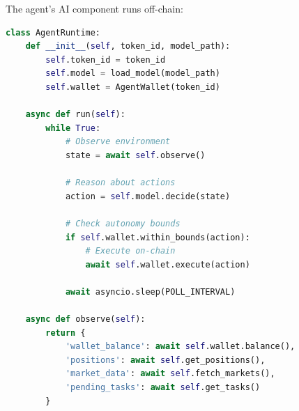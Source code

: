 The agent's AI component runs off-chain:

\begin{lstlisting}[language=python,caption=Agent Runtime]
class AgentRuntime:
    def __init__(self, token_id, model_path):
        self.token_id = token_id
        self.model = load_model(model_path)
        self.wallet = AgentWallet(token_id)

    async def run(self):
        while True:
            # Observe environment
            state = await self.observe()

            # Reason about actions
            action = self.model.decide(state)

            # Check autonomy bounds
            if self.wallet.within_bounds(action):
                # Execute on-chain
                await self.wallet.execute(action)

            await asyncio.sleep(POLL_INTERVAL)

    async def observe(self):
        return {
            'wallet_balance': await self.wallet.balance(),
            'positions': await self.get_positions(),
            'market_data': await self.fetch_markets(),
            'pending_tasks': await self.get_tasks()
        }
\end{lstlisting}

